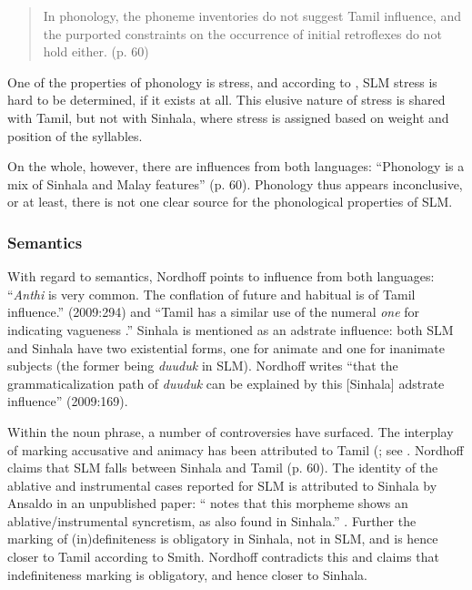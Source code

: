 \begin{quote}
In phonology, the phoneme inventories do not suggest Tamil influence, and the purported constraints on the occurrence of initial retroflexes do not hold either. (p. 60) 
\end{quote}

One of the properties of phonology is stress, and according to  
\citet[131]{Nordhoff2009}, SLM stress is hard to be determined, if it  
exists at all. This elusive nature of stress is shared with Tamil, but not  
with Sinhala, where stress is assigned based on weight and position of the  
syllables.

On the whole, however, there are influences from both languages: ``Phonology is a mix of Sinhala and Malay features'' (p. 60). Phonology thus appears inconclusive, or at least, there is not one clear source for the phonological properties of SLM.

\subsubsection{Semantics}%
With regard to semantics, Nordhoff points to influence from both languages: ``\textit{Anthi} is very common. The conflation of future and habitual is of Tamil influence.'' (2009:294) and ``Tamil has a similar use of the numeral \textit{one} for indicating vagueness \citep[135, cited on p. 322]{Schiffman1999}.''  %
Sinhala is mentioned as an adstrate influence: both SLM and Sinhala have two existential forms, one for animate and one for inanimate subjects (the former being \textit{duuduk} in SLM). Nordhoff writes ``that the grammaticalization path of \textit{duuduk} can be explained by this [Sinhala] adstrate influence'' (2009:169). 

Within the noun phrase, a number of controversies have surfaced. The interplay of marking accusative and animacy has been attributed to Tamil (\citet{Smith2003timing}; see \citet[59]{Nordhoff2009}. Nordhoff claims that SLM falls between Sinhala and Tamil (p. 60). The identity of the ablative and instrumental cases reported for SLM is attributed to Sinhala by Ansaldo in an unpublished paper: ``\citet{Ansaldo2005ms} notes that this morpheme shows an ablative/instrumental syncretism, as also found in Sinhala.'' \citep[345]{Nordhoff2009}. Further the marking of (in)definiteness is obligatory in Sinhala, not in SLM, and is hence closer to Tamil according to Smith. Nordhoff contradicts this and claims that indefiniteness marking is obligatory, and hence closer to Sinhala.
 
